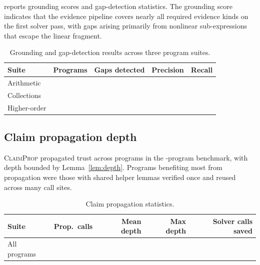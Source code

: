 \documentclass[11pt]{article}
\newcommand{\PropAlg}{\textsc{ClaimProp}}    %
\begin{document}
 reports grounding scores and gap-detection
statistics.
The grounding score indicates that the evidence
pipeline covers nearly all required evidence kinds on the first
solver pass, with gaps arising primarily from nonlinear
sub-expressions that escape the linear fragment.

\begin{table}[htbp]
\centering
\caption{Grounding and gap-detection results across three program suites.}
\label{tab:grounding}
\begin{tabular}{@{}lrrrr@{}}
\toprule
\textbf{Suite} & \textbf{Programs} & \textbf{Gaps detected} &
  \textbf{Precision} & \textbf{Recall} \\
\midrule
Arithmetic   & \ppThirteenArithPrograms{} & \ppThirteenArithGaps{} & \ppThirteenArithPrecision{} & \ppThirteenArithRecall{} \\
Collections  & \ppThirteenCollectPrograms{} & \ppThirteenCollectGaps{} & \ppThirteenCollectPrecision{} & \ppThirteenCollectRecall{} \\
Higher-order & \ppThirteenHigherPrograms{} & \ppThirteenHigherGaps{} & \ppThirteenHigherPrecision{} & \ppThirteenHigherRecall{} \\
\bottomrule
\end{tabular}
\end{table}

\subsection{Claim propagation depth}

\PropAlg{} propagated trust across programs in the \expTotalPrograms-program benchmark,
with depth bounded by Lemma~\ref{lem:depth}.
Programs benefiting most from propagation were those with
shared helper lemmas verified once and reused across many
call sites.

\begin{table}[htbp]
\centering
\caption{Claim propagation statistics.}
\label{tab:propagation}
\begin{tabular}{@{}lrrrr@{}}
\toprule
\textbf{Suite} & \textbf{Prop.\ calls} &
  \textbf{Mean depth} & \textbf{Max depth} &
  \textbf{Solver calls saved} \\
\midrule
All programs & \ppThirteenTotalDeclarations{} & \ppThirteenMeanDeclsPerCoord{} & \ppThirteenMeanAssertsPerCoord{} & \ppThirteenTotalAssertions{} \\
\bottomrule
\end{tabular}
\end{table}
\end{document}

